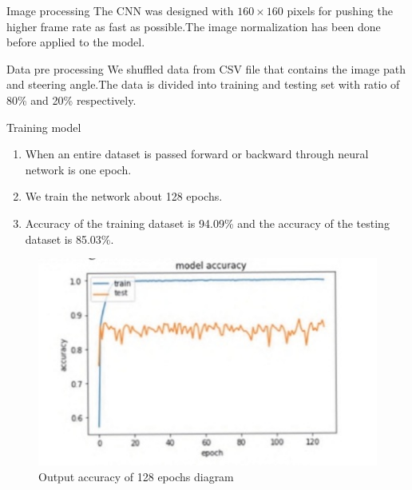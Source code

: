 \documentclass{beamer}
\begin{document}
\begin{frame}

\begin{block}{Image processing}
  The CNN was designed with $160 \times 160$ pixels for pushing the higher frame rate as fast as possible.The image normalization has been done before applied to the model.
\end{block}

\begin{block}{Data pre processing}
We shuffled data from CSV file that contains the image path and steering angle.The data is divided into training and testing set with ratio of 80\% and 20\% respectively.

\end{block}

\begin{block}{Training model}
\begin{enumerate}

\item When an entire dataset is passed forward or backward through neural network is one epoch.
\item We train the network about 128 epochs. 
\item Accuracy of the training dataset is 94.09\% and the accuracy of the testing dataset is 85.03\%.
\end{enumerate}
\end{block}

\end{frame}

\begin{frame}
\begin{figure}[ht]
    \centering
    \includegraphics[width=1\textwidth]{Output accuracy.jpg}
    \caption{Output accuracy of 128 epochs diagram}
\end{figure}
    
\end{frame}
\end{document}
